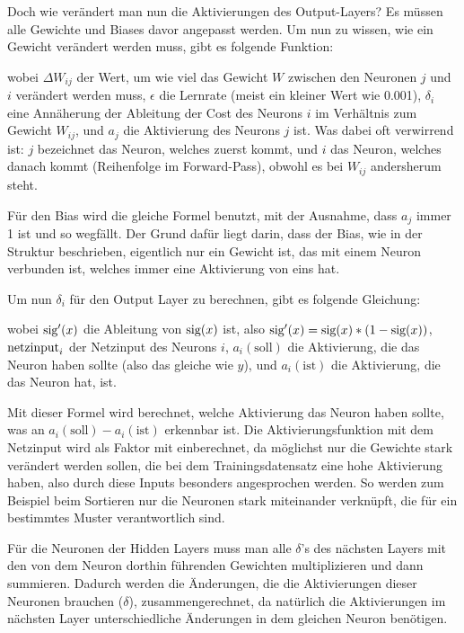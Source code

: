 \documentclass[11pt]{scrartcl}
\begin{document}
	Doch wie verändert man nun die Aktivierungen des Output-Layers? Es müssen alle Gewichte und Biases davor angepasst werden. Um nun zu wissen, wie ein Gewicht verändert werden muss, gibt es folgende Funktion:

	\form{\[
		\Delta W_{ij} = \epsilon * \delta_i * a_j
	\]}

	wobei $\Delta W_{ij}$ der Wert, um wie viel das Gewicht $W$ zwischen den Neuronen $j$ und $i$ verändert werden muss, $\epsilon$ die Lernrate (meist ein kleiner Wert wie 0.001), $\delta_i$ eine Annäherung der Ableitung der Cost des Neurons $i$ im Verhältnis zum Gewicht $W_{ij}$, und $a_j$ die Aktivierung des Neurons $j$ ist. Was dabei oft verwirrend ist: $j$ bezeichnet das Neuron, welches zuerst kommt, und $i$ das Neuron, welches danach kommt (Reihenfolge im Forward-Pass), obwohl es bei $W_{ij}$ andersherum steht.

	Für den Bias wird die gleiche Formel benutzt, mit der Ausnahme, dass $a_j$ immer 1 ist und so wegfällt. Der Grund dafür liegt darin, dass der Bias, wie in der Struktur beschrieben, eigentlich nur ein Gewicht ist, das mit einem Neuron verbunden ist, welches immer eine Aktivierung von eins hat.

	Um nun $\delta_i$ für den Output Layer zu berechnen, gibt es folgende Gleichung: 

	\form{\[
		\delta_i = \sig '\left({\netin}_i\right) * (a_i (\textrm{soll}) - a_i (\textrm{ist})) 
	\]}

	wobei $\textrm{sig} '(x)$ die Ableitung von $\textrm{sig}(x)$ ist, also $\textrm{sig}'(x) = \textrm{sig}(x) * (1 - \textrm{sig}(x))$, $\textrm{netzinput}_i$ der Netzinput des Neurons $i$, $a_i(\textrm{soll})$ die Aktivierung, die das Neuron haben sollte (also das gleiche wie $y$), und $a_i(\textrm{ist})$ die Aktivierung, die das Neuron hat, ist.

	Mit dieser Formel wird berechnet, welche Aktivierung das Neuron haben sollte, was an $a_i(\textrm{soll}) - a_i(\textrm{ist})$ erkennbar ist. Die Aktivierungsfunktion mit dem Netzinput wird als Faktor mit einberechnet, da möglichst nur die Gewichte stark verändert werden sollen, die bei dem Trainingsdatensatz eine hohe Aktivierung haben, also durch diese Inputs besonders angesprochen werden. So werden zum Beispiel beim Sortieren nur die Neuronen stark miteinander verknüpft, die für ein bestimmtes Muster verantwortlich sind.
	
	Für die Neuronen der Hidden Layers muss man alle $\delta$'s des nächsten Layers mit den von dem Neuron dorthin führenden Gewichten multiplizieren und dann summieren. Dadurch werden die Änderungen, die die Aktivierungen dieser Neuronen brauchen ($\delta$), zusammengerechnet, da natürlich die Aktivierungen im nächsten Layer unterschiedliche Änderungen in dem gleichen Neuron benötigen.
	
\end{document}
